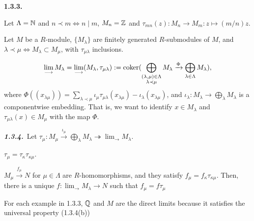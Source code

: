 \documentclass{../../../small}
\begin{document}
\begin{ex*}\hspace{-5pt}\textbf{1.3.3.}\,
\begin{parts}
\item Let $\Lambda=\mathbb{N}$ and $n\prec m\Leftrightarrow n\mid m$, $M_n=\mathbb{Z}$ and $\tau_{mn}(z):M_n\to M_m:z\mapsto(m/n)z$.
\item Let $M$ be a $R$-module, $\{M_\lambda\}$ are finitely generated $R$-submodules of $M$, and $\lambda\prec\mu\Leftrightarrow M_\lambda\subset M_\mu$, with $\tau_{\mu\lambda}$ inclusions.
\end{parts}
\end{ex*}

\begin{defn*}
\[\lim_{\longrightarrow}M_\lambda=\lim_{\longrightarrow}(M_\lambda,\tau_{\mu\lambda}):=\operatorname{coker}(\bigoplus_{\substack{(\lambda,\mu)\in\Lambda\\\lambda\prec\mu}} M_\lambda\xrightarrow{\Phi}\bigoplus_{\lambda\in\Lambda}M_{\lambda}),\]
where $\Phi((x_{\lambda\mu}))=\sum_{\lambda\prec\mu}\iota_\mu\tau_{\mu\lambda}(x_{\lambda\mu})-\iota_\lambda(x_{\lambda\mu})$, and $\iota_\lambda:M_\lambda\to\bigoplus_\lambda M_\lambda$ is a componentwise embedding.
That is, we want to identify $x\in M_\lambda$ and $\tau_{\mu\lambda}(x)\in M_\mu$ with the map $\Phi$.
\end{defn*}
\begin{prop*}\hspace{-5pt}\emph{\textbf{1.3.4.}}\,
Let $\tau_\mu:M_\mu\xrightarrow{\iota_\mu}\bigoplus_\lambda M_\lambda\twoheadrightarrow\lim_{\longrightarrow}M_\lambda$.
\begin{parts}
\item $\tau_\mu=\tau_\kappa\tau_{\kappa\mu}$.
\item $M_\mu\xrightarrow{f_\mu} N$ for $\mu\in\Lambda$ are $R$-homomorphisms, and they satisfy $f_\mu=f_\kappa\tau_{\kappa\mu}$. Then, there is a unique $f:\lim_{\longrightarrow}M_\lambda\to N$ such that $f_\mu=f\tau_\mu$
\end{parts}
\end{prop*}

For each example in 1.3.3, $\mathbb{Q}$ and $M$ are the direct limits because it satisfies the universal property (1.3.4(b))
\end{document}
